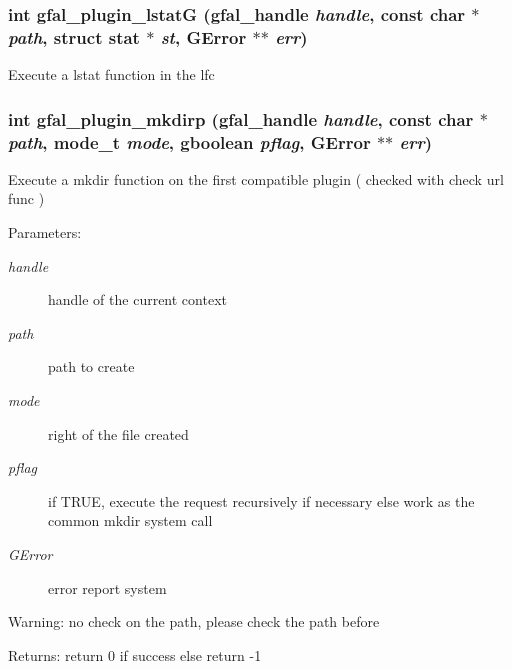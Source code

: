 \subsubsection{\setlength{\rightskip}{0pt plus 5cm}int gfal\_\-plugin\_\-lstat\-G (gfal\_\-handle {\em handle}, const char $\ast$ {\em path}, struct stat $\ast$ {\em st}, GError $\ast$$\ast$ {\em err})}\label{gfal__common__plugin_8h_81a0d301234958fc59518fb6ce306425}


Execute a lstat function in the lfc 
\subsubsection{\setlength{\rightskip}{0pt plus 5cm}int gfal\_\-plugin\_\-mkdirp (gfal\_\-handle {\em handle}, const char $\ast$ {\em path}, mode\_\-t {\em mode}, gboolean {\em pflag}, GError $\ast$$\ast$ {\em err})}\label{gfal__common__plugin_8h_815a97902a1067b99f9bcc2f63b19e11}


Execute a mkdir function on the first compatible plugin ( checked with check url func ) \begin{Desc}
\item[Parameters:]
\begin{description}
\item[{\em handle}]handle of the current context \item[{\em path}]path to create \item[{\em mode}]right of the file created \item[{\em pflag}]if TRUE, execute the request recursively if necessary else work as the common mkdir system call \item[{\em GError}]error report system \end{description}
\end{Desc}
\begin{Desc}
\item[Warning:]no check on the path, please check the path before \end{Desc}
\begin{Desc}
\item[Returns:]return 0 if success else return -1 \end{Desc}
